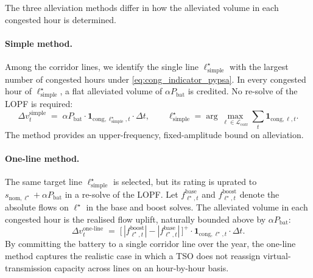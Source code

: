 The three alleviation methods differ in how the alleviated volume in each congested hour is determined.
 
\paragraph{Simple method.} Among the corridor lines, we identify the single line $\ell^\star_{\mathrm{simple}}$ with the largest number of congested hours under \eqref{eq:cong_indicator_pypsa}. In every congested hour of $\ell^\star_{\mathrm{simple}}$, a flat alleviated volume of $\alpha P_{\mathrm{bat}}$ is credited. No re-solve of the LOPF is required:
\begin{equation}
    \Delta v^{\mathrm{simple}}_t \;=\; \alpha P_{\mathrm{bat}} \cdot \mathbf{1}_{\mathrm{cong},\ell^\star_{\mathrm{simple}},t} \cdot \Delta t,
    \qquad
    \ell^\star_{\mathrm{simple}}
    = \arg\max_{\ell \in \mathcal{L}_{\mathrm{corr}}} \sum_{t} \mathbf{1}_{\mathrm{cong},\ell,t}.
    \label{eq:vol_simple}
\end{equation}
The method provides an upper-frequency, fixed-amplitude bound on alleviation.
 
\paragraph{One-line method.} The same target line $\ell^\star_{\mathrm{simple}}$ is selected, but its rating is uprated to $s_{\mathrm{nom},\ell^\star} + \alpha P_{\mathrm{bat}}$ in a re-solve of the LOPF. Let $f^{\mathrm{base}}_{\ell^\star,t}$ and $f^{\mathrm{boost}}_{\ell^\star,t}$ denote the absolute flows on $\ell^\star$ in the base and boost solves. The alleviated volume in each congested hour is the realised flow uplift, naturally bounded above by $\alpha P_{\mathrm{bat}}$:
\begin{equation}
    \Delta v^{\mathrm{one\text{-}line}}_t
    \;=\; \bigl[\,|f^{\mathrm{boost}}_{\ell^\star,t}| - |f^{\mathrm{base}}_{\ell^\star,t}|\,\bigr]^{+} \cdot \mathbf{1}_{\mathrm{cong},\ell^\star,t} \cdot \Delta t.
    \label{eq:vol_oneline}
\end{equation}
By committing the battery to a single corridor line over the year, the one-line method captures the realistic case in which a TSO does not reassign virtual-transmission capacity across lines on an hour-by-hour basis.
 
